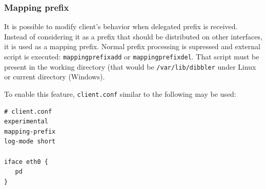 \subsubsection{Mapping prefix}
It is possible to modify client's behavior when delegated prefix is
received. Instead of considering it as a prefix that should be
distributed on other interfaces, it is used as a mapping
prefix. Normal prefix processing is supressed and external script is
executed: \verb+mappingprefixadd+ or \verb+mappingprefixdel+. That
script must be present in the working directory (that would be
\verb+/var/lib/dibbler+ under Linux or current directory (Windows).

To enable this feature, \verb+client.conf+ similar to the following
may be used:

\begin{lstlisting}
# client.conf
experimental
mapping-prefix
log-mode short

iface eth0 {
   pd
}
\end{lstlisting}
